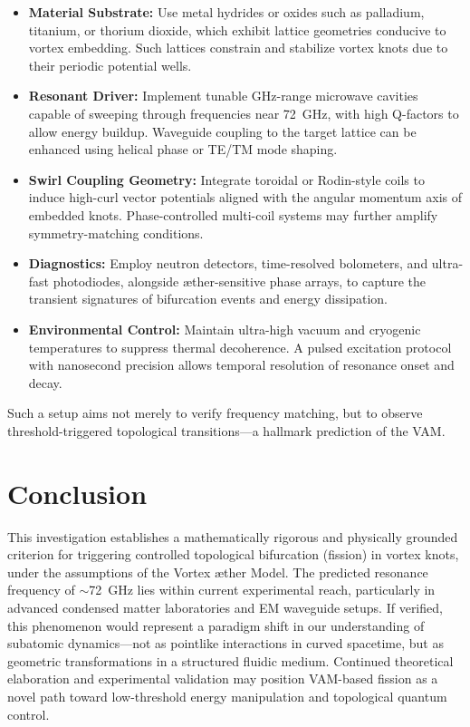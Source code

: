 \documentclass[a4paper, aps,preprint,superscriptaddress, 12pt]{revtex4}
\begin{document}
\begin{itemize}
\item \textbf{Material Substrate:} Use metal hydrides or oxides such as palladium, titanium, or thorium dioxide, which exhibit lattice geometries conducive to vortex embedding. Such lattices constrain and stabilize vortex knots due to their periodic potential wells.
\item \textbf{Resonant Driver:} Implement tunable GHz-range microwave cavities capable of sweeping through frequencies near \SI{72}{GHz}, with high Q-factors to allow energy buildup. Waveguide coupling to the target lattice can be enhanced using helical phase or TE/TM mode shaping.
\item \textbf{Swirl Coupling Geometry:} Integrate toroidal or Rodin-style coils to induce high-curl vector potentials aligned with the angular momentum axis of embedded knots. Phase-controlled multi-coil systems may further amplify symmetry-matching conditions.
\item \textbf{Diagnostics:} Employ neutron detectors, time-resolved bolometers, and ultra-fast photodiodes, alongside \ae{}ther-sensitive phase arrays, to capture the transient signatures of bifurcation events and energy dissipation.
\item \textbf{Environmental Control:} Maintain ultra-high vacuum and cryogenic temperatures to suppress thermal decoherence. A pulsed excitation protocol with nanosecond precision allows temporal resolution of resonance onset and decay.
\end{itemize}

Such a setup aims not merely to verify frequency matching, but to observe threshold-triggered topological transitions---a hallmark prediction of the VAM.

\section*{Conclusion}

This investigation establishes a mathematically rigorous and physically grounded criterion for triggering controlled topological bifurcation (fission) in vortex knots, under the assumptions of the Vortex \ae{}ther Model. The predicted resonance frequency of $\sim$\SI{72}{GHz} lies within current experimental reach, particularly in advanced condensed matter laboratories and EM waveguide setups. If verified, this phenomenon would represent a paradigm shift in our understanding of subatomic dynamics---not as pointlike interactions in curved spacetime, but as geometric transformations in a structured fluidic medium. Continued theoretical elaboration and experimental validation may position VAM-based fission as a novel path toward low-threshold energy manipulation and topological quantum control.
\end{document}
